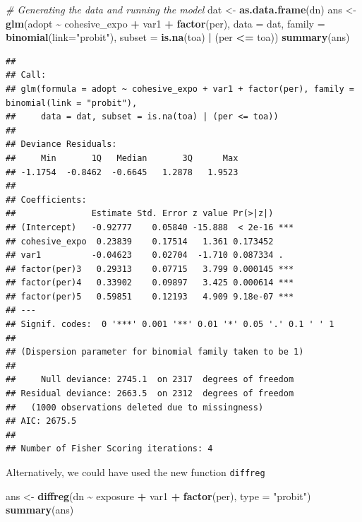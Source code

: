 \documentclass[
]{book}
\newenvironment{Shaded}{\begin{snugshade}}{\end{snugshade}}
\newcommand{\AttributeTok}[1]{\textcolor[rgb]{0.13,0.29,0.53}{#1}}
\newcommand{\CommentTok}[1]{\textcolor[rgb]{0.56,0.35,0.01}{\textit{#1}}}
\newcommand{\FunctionTok}[1]{\textcolor[rgb]{0.13,0.29,0.53}{\textbf{#1}}}
\newcommand{\NormalTok}[1]{#1}
\newcommand{\OtherTok}[1]{\textcolor[rgb]{0.56,0.35,0.01}{#1}}
\newcommand{\SpecialCharTok}[1]{\textcolor[rgb]{0.81,0.36,0.00}{\textbf{#1}}}
\newcommand{\StringTok}[1]{\textcolor[rgb]{0.31,0.60,0.02}{#1}}
\begin{document}
\begin{itemize}
\begin{Shaded}
\begin{Highlighting}[]
\CommentTok{\# Generating the data and running the model}
\NormalTok{dat }\OtherTok{\textless{}{-}} \FunctionTok{as.data.frame}\NormalTok{(dn)}
\NormalTok{ans }\OtherTok{\textless{}{-}} \FunctionTok{glm}\NormalTok{(adopt }\SpecialCharTok{\textasciitilde{}}\NormalTok{ cohesive\_expo }\SpecialCharTok{+}\NormalTok{ var1 }\SpecialCharTok{+} \FunctionTok{factor}\NormalTok{(per),}
           \AttributeTok{data =}\NormalTok{ dat,}
           \AttributeTok{family =} \FunctionTok{binomial}\NormalTok{(}\AttributeTok{link=}\StringTok{"probit"}\NormalTok{),}
           \AttributeTok{subset =} \FunctionTok{is.na}\NormalTok{(toa) }\SpecialCharTok{|}\NormalTok{ (per }\SpecialCharTok{\textless{}=}\NormalTok{ toa))}
\FunctionTok{summary}\NormalTok{(ans)}
\end{Highlighting}
\end{Shaded}

\begin{verbatim}
## 
## Call:
## glm(formula = adopt ~ cohesive_expo + var1 + factor(per), family = binomial(link = "probit"), 
##     data = dat, subset = is.na(toa) | (per <= toa))
## 
## Deviance Residuals: 
##     Min       1Q   Median       3Q      Max  
## -1.1754  -0.8462  -0.6645   1.2878   1.9523  
## 
## Coefficients:
##               Estimate Std. Error z value Pr(>|z|)    
## (Intercept)   -0.92777    0.05840 -15.888  < 2e-16 ***
## cohesive_expo  0.23839    0.17514   1.361 0.173452    
## var1          -0.04623    0.02704  -1.710 0.087334 .  
## factor(per)3   0.29313    0.07715   3.799 0.000145 ***
## factor(per)4   0.33902    0.09897   3.425 0.000614 ***
## factor(per)5   0.59851    0.12193   4.909 9.18e-07 ***
## ---
## Signif. codes:  0 '***' 0.001 '**' 0.01 '*' 0.05 '.' 0.1 ' ' 1
## 
## (Dispersion parameter for binomial family taken to be 1)
## 
##     Null deviance: 2745.1  on 2317  degrees of freedom
## Residual deviance: 2663.5  on 2312  degrees of freedom
##   (1000 observations deleted due to missingness)
## AIC: 2675.5
## 
## Number of Fisher Scoring iterations: 4
\end{verbatim}

  Alternatively, we could have used the new function \texttt{diffreg}

\begin{Shaded}
\begin{Highlighting}[]
\NormalTok{ans }\OtherTok{\textless{}{-}} \FunctionTok{diffreg}\NormalTok{(dn }\SpecialCharTok{\textasciitilde{}}\NormalTok{ exposure }\SpecialCharTok{+}\NormalTok{ var1 }\SpecialCharTok{+} \FunctionTok{factor}\NormalTok{(per), }\AttributeTok{type =} \StringTok{"probit"}\NormalTok{)}
\FunctionTok{summary}\NormalTok{(ans)}
\end{Highlighting}
\end{Shaded}


\end{itemize}
\end{document}
